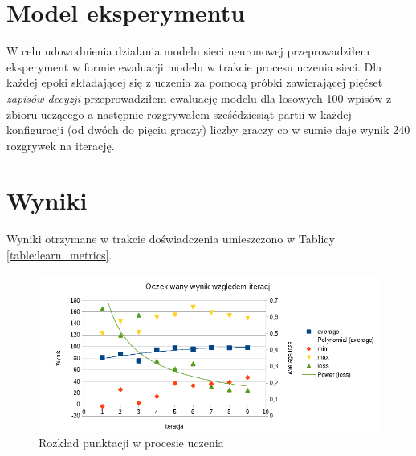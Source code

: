 \documentclass[12pt, oneside]{report}
\begin{document}
\section{Model eksperymentu}
W celu udowodnienia działania modelu sieci neuronowej przeprowadziłem eksperyment w formie ewaluacji modelu w trakcie procesu uczenia sieci. Dla każdej epoki składającej się z uczenia za pomocą próbki zawierającej pięćset \textit{zapisów decyzji} przeprowadziłem ewaluację modelu dla losowych 100 wpisów z zbioru uczącego a następnie rozgrywałem sześćdziesiąt partii w każdej konfiguracji (od dwóch do pięciu graczy) liczby graczy co w sumie daje wynik 240 rozgrywek na iterację.
\section{Wyniki}
Wyniki otrzymane w trakcie doświadczenia umieszczono w Tablicy \ref{table:learn_metrics}.

\begin{figure}
	\includegraphics{WykresPunktowPosteIteracji.png}
	\caption{Rozkład punktacji w procesie uczenia}
	\label{figure:learn_results}
\end{figure}
\end{document}
